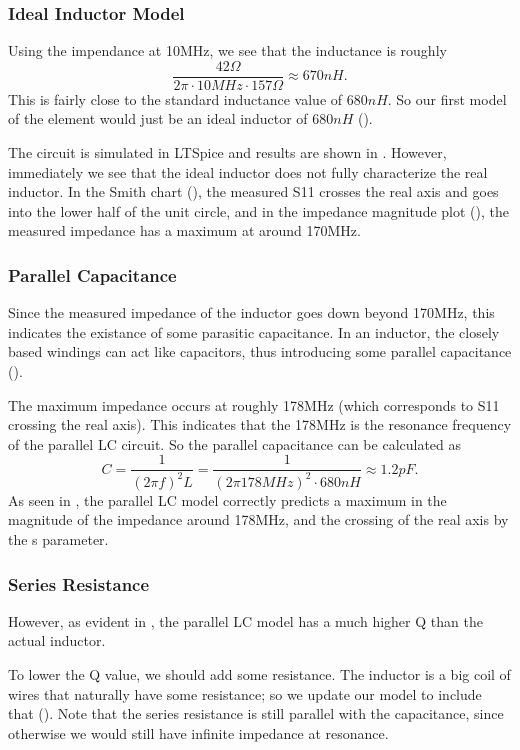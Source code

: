 \documentclass{article}
\begin{document}
\subsubsection{Ideal Inductor Model}

Using the impendance at 10MHz, we see that the inductance is roughly
$$\frac{42\Omega}{2\pi\cdot 10MHz \cdot 157 \Omega} \approx 670nH .$$
This is fairly close to the standard inductance value of $680nH$.
So our first model of the element would just be an ideal inductor of $680nH$ ().

The circuit is simulated in LTSpice and results are shown in .
However, immediately we see that the ideal inductor does not fully characterize the real inductor.
In the Smith chart (), the measured S11 crosses the real axis and goes into the lower half of the unit circle, and in the impedance magnitude plot (), the measured impedance has a maximum at around 170MHz.


\subsubsection{Parallel Capacitance}
Since the measured impedance of the inductor goes down beyond 170MHz, this indicates the existance of some parasitic capacitance.
In an inductor, the closely based windings can act like capacitors, thus introducing some parallel capacitance ().

The maximum impedance occurs at roughly 178MHz (which corresponds to S11 crossing the real axis).
This indicates that the 178MHz is the resonance frequency of the parallel LC circuit.
So the parallel capacitance can be calculated as
\[
    C = \frac{1}{(2\pi f)^2 L}
    = \frac{1}{(2\pi 178MHz)^2 \cdot 680nH}
    \approx
    1.2pF.
\]
As seen in , the parallel LC model correctly predicts a maximum in the magnitude of the impedance around 178MHz, and the crossing of the real axis by the s parameter.

\subsubsection{Series Resistance}
However, as evident in , the parallel LC model has a much higher Q than the actual inductor.

To lower the Q value, we should add some resistance.
The inductor is a big coil of wires that naturally have some resistance;
so we update our model to include that ().
Note that the series resistance is still parallel with the capacitance, since otherwise we would still have infinite impedance at resonance.
\end{document}
